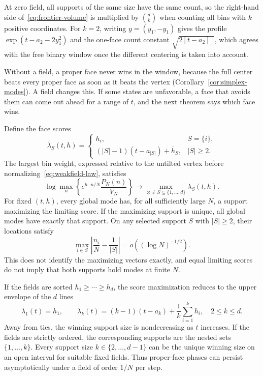 At zero field, all supports of the same size have the same count, so the
right-hand side of~\eqref{eq:frontier-volume} is multiplied by
$\binom dk$ when counting all bins with $k$ positive coordinates.
For $k=2$, writing $y=(y_1,-y_1)$ gives the profile
$\exp(t-a_2-2y_1^2)$ and the one-face count constant
$\sqrt{2[t-a_2]_+}$, which agrees with the free binary window once the
different centering is taken into account.

Without a field, a proper face never wins in the window, because the full
center beats every proper face as soon as it beats the vertex
(Corollary~\ref{cor:simplex-modes}). A field changes this. If some states
are unfavorable, a face that avoids them can come out ahead for a range of
$t$, and the next theorem says which face wins.

\begin{theorem}\label{thm:weakfield-phases}
Define the face scores
\[
 \lambda_S(t,h)=
 \begin{cases}
 h_i,& S=\{i\},\\
 (|S|-1)(t-a_{|S|})+\overline h_S,& |S|\ge2.
 \end{cases}
\]
The largest bin weight, expressed relative to the untilted vertex before
normalizing~\eqref{eq:weakfield-law}, satisfies
\begin{equation}\label{eq:weakfield-maximum}
 \log\max_n\left\{e^{h\cdot n/N}\frac{P_N(n)}{V_N}\right\}
 \longrightarrow \max_{\varnothing\ne S\subseteq\{1,\ldots,d\}}
 \lambda_S(t,h).
\end{equation}
For fixed $(t,h)$, every global mode has, for all sufficiently large $N$,
a support maximizing the limiting score. If the maximizing support is
unique, all global modes have exactly that support. On any selected
support $S$ with $|S|\ge2$, their locations satisfy
\[
 \max_{i\in S}\left|\frac{n_i}{N}-\frac1{|S|}\right|
 =o((\log N)^{-1/2}).
\]
This does not identify the maximizing vectors exactly, and equal limiting
scores do not imply that both supports hold modes at finite $N$.

If the fields are sorted $h_1\ge\cdots\ge h_d$, the score maximization
reduces to the upper envelope of the $d$ lines
\begin{equation}\label{eq:weakfield-lines}
 \lambda_1(t)=h_1,\qquad
 \lambda_k(t)=(k-1)(t-a_k)+\frac1k\sum_{i=1}^k h_i,
 \quad 2\le k\le d.
\end{equation}
Away from ties, the winning support size is nondecreasing as $t$ increases.
If the fields are strictly ordered, the corresponding supports are the
nested sets $\{1,\ldots,k\}$. Every support size $k\in\{2,\ldots,d-1\}$
can be the unique winning size on an open interval for suitable fixed
fields. Thus proper-face phases can persist asymptotically under a field
of order $1/N$ per step.
\end{theorem}

